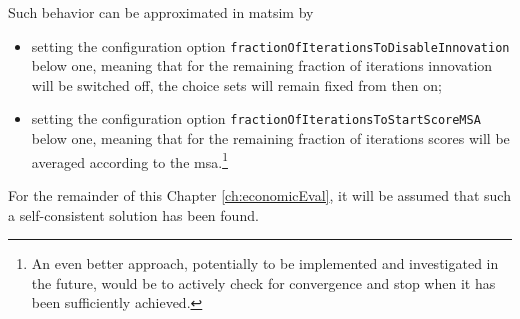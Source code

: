 Such behavior can be approximated
%
%
in \acrshort{matsim} by
%
\begin{itemize}\styleItemize
\item setting the configuration option \verb$fractionOfIterationsToDisableInnovation$ below one,  meaning that for the remaining fraction of iterations innovation will be switched off, \ie the choice sets will remain fixed from then on;

\item setting the configuration option \verb$fractionOfIterationsToStartScoreMSA$ below one, meaning that for the remaining fraction of iterations scores will be averaged according to the \gls{msa}.\footnote{%
%
An even better approach, potentially to be implemented and investigated in the future, would be to actively check for convergence and stop when it has been sufficiently achieved.
%
%
}
\end{itemize}
%

For the remainder of this Chapter \ref{ch:economicEval}, it will be assumed that such a self-consistent solution has been found.
%

%

